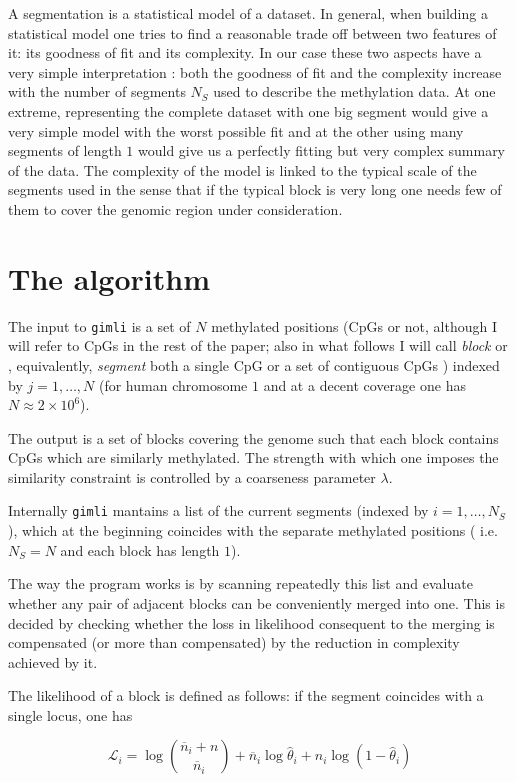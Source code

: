 \documentclass[11pt]{amsart}
\newcommand{\lik}{\ensuremath{\mathcal{L}}}
\begin{document}
A segmentation is a statistical model of a dataset.
In general, when building a statistical model one tries to find a reasonable 
trade off between two 
features of it: its goodness of fit and its complexity.
In our case these two aspects have a very simple interpretation : both the goodness 
of fit and the complexity increase with the number of segments $N_S$ used to describe the 
methylation data.  
At one extreme, representing the complete dataset with one big segment would 
give a very simple model with the worst possible fit and 
at the other using many segments of length $1$ would give us a perfectly 
fitting but very complex summary of the data.
The complexity of the model is linked to the typical scale of the segments used
in the sense that if the typical block is very long one needs few of them to 
cover the genomic region under consideration.

\section{The algorithm}

The  input to \texttt{gimli} is a set of $N$ methylated positions 
(CpGs or not, although I will refer to CpGs in the rest of the paper; also in what
follows I will call {\em block} or ,
equivalently, {\em segment}
both a single CpG or a set of contiguous CpGs ) indexed by $j=1,\dots,N$ 
(for human chromosome $1$ and at a 
decent coverage one has $N \approx 2\times 10^6$).

The output is a set of blocks 
covering the genome 
such that each block contains CpGs which are similarly
methylated. The strength with which
one imposes the similarity constraint
is controlled by a coarseness parameter $\lambda$.

Internally \texttt{gimli} mantains a list of the current  
segments (indexed by $i=1,\dots,N_S$), 
which at the beginning 
coincides with the separate methylated positions 
( i.e.  $N_S=N$ and each block has length $1$). 

The way the program works is by 
scanning repeatedly this list and evaluate whether any pair 
of adjacent blocks can be conveniently merged into one.  
This is decided by checking whether the loss in 
likelihood consequent to the merging is compensated 
(or more than compensated)
by the reduction in complexity achieved by it.

The likelihood of a block is defined as follows: if the
segment coincides with a single locus, one has

\begin{equation}
\lik_i=\log {\overline{n}_i+n \choose \overline{n}_i} +
	{\overline{n}_i}\log\hat{\theta}_i+
	n_i\log(1-\hat{\theta}_i)
\end{equation}
\label{loglik}
\end{document}
